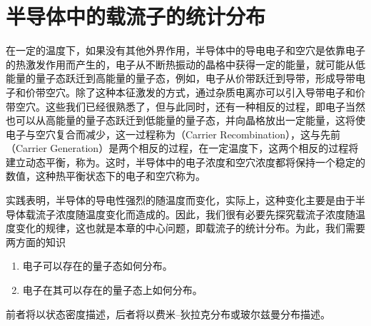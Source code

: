 \section{半导体中的载流子的统计分布}
在一定的温度下，如果没有其他外界作用，半导体中的导电电子和空穴是依靠电子的热激发作用而产生的，电子从不断热振动的晶格中获得一定的能量，就可能从低能量的量子态跃迁到高能量的量子态，例如，电子从价带跃迁到导带，形成导带电子和价带空穴。除了这种本征激发的方式，通过杂质电离亦可以引入导带电子和价带空穴。这些我们已经很熟悉了，但与此同时，还有一种相反的过程，即电子当然也可以从高能量的量子态跃迁到低能量的量子态，并向晶格放出一定能量，这将使电子与空穴复合而减少，这一过程称为（Carrier Recombination），这与先前（Carrier Generation）是两个相反的过程，在一定温度下，这两个相反的过程将建立动态平衡，称为。这时，半导体中的电子浓度和空穴浓度都将保持一个稳定的数值，这种热平衡状态下的电子和空穴称为。

实践表明，半导体的导电性强烈的随温度而变化，实际上，这种变化主要是由于半导体载流子浓度随温度变化而造成的。因此，我们很有必要先探究载流子浓度随温度变化的规律，这也就是本章的中心问题，即载流子的统计分布。为此，我们需要两方面的知识
\begin{enumerate}
    \item 电子可以存在的量子态如何分布。
    \item 电子在其可以存在的量子态上如何分布。
\end{enumerate}
前者将以状态密度描述，后者将以费米--狄拉克分布或玻尔兹曼分布描述。